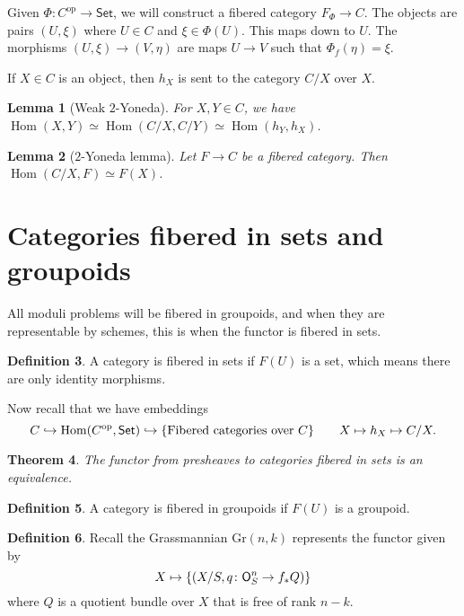 \documentclass[leqno, openany]{memoir}
\newtheorem{thm}{Theorem}[section]
\newtheorem{lem}[thm]{Lemma}
\theoremstyle{definition}
\newtheorem{defn}[thm]{Definition}
\theoremstyle{remark}
\theoremstyle{plain}
\theoremstyle{definition}
\theoremstyle{remark}
\newcommand{\mr}[1]{\mathrm{#1}}
\newcommand{\ms}[1]{\mathsf{#1}}
\DeclareMathOperator{\Hom}{Hom}
\begin{document}
Given $\Phi \colon C^{\mr{op}} \to \ms{Set}$, we will construct a fibered category $F_{\Phi} \to C$. The objects are pairs $(U, \xi)$ where $U \in C$ and $\xi \in \Phi(U)$. This maps down to $U$. The morphisms $(U, \xi) \to (V, \eta)$ are maps $U \to V$ such that $\Phi_f(\eta) = \xi$.

If $X \in C$ is an object, then $h_X$ is sent to the category $C/X$ over $X$.

\begin{lem}[Weak $2$-Yoneda]
    For $X,Y \in C$, we have $\Hom(X,Y) \simeq \Hom(C/X, C/Y) \simeq \Hom(h_Y, h_X)$.
\end{lem}

\begin{lem}[$2$-Yoneda lemma]
    Let $F \to C$ be a fibered category. Then $\Hom(C/X, F) \simeq F(X)$.
\end{lem}

\section{Categories fibered in sets and groupoids}%
\label{sec:categories_fibered_in_sets_and_groupoids}

All moduli problems will be fibered in groupoids, and when they are representable by schemes, this is when the functor is fibered in sets.

\begin{defn}
    A category is fibered in sets if $F(U)$ is a set, which means there are only identity morphisms.
\end{defn}

Now recall that we have embeddings
\[ C \hookrightarrow \Hom(C^{\mr{op}}, \ms{Set}) \hookrightarrow \qty{\text{Fibered categories over } C} \qquad X \mapsto h_X \mapsto C/X. \]

\begin{thm}
    The functor from presheaves to categories fibered in sets is an equivalence. 
\end{thm}

\begin{defn}
    A category is fibered in groupoids if $F(U)$ is a groupoid.
\end{defn}

\begin{defn}
    Recall the Grassmannian $\mr{Gr}(n,k)$ represents the functor given by 
    \[ X \mapsto \qty{(X/S, q \colon \ms{O}_S^n \to f_* Q)}\] 
    where $Q$ is a quotient bundle over $X$ that is free of rank $n-k$.
\end{defn}
\end{document}

